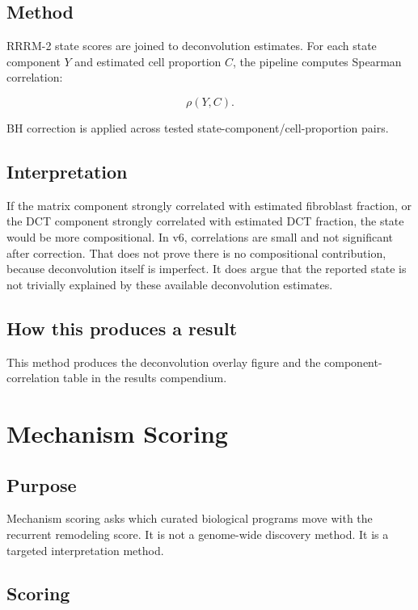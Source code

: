 \documentclass[11pt]{article}
\begin{document}
\subsection{Method}

RRRM-2 state scores are joined to deconvolution estimates. For each state component $Y$ and estimated cell proportion $C$, the pipeline computes Spearman correlation:

\begin{equation}
\rho(Y,C).
\end{equation}

BH correction is applied across tested state-component/cell-proportion pairs.

\subsection{Interpretation}

If the matrix component strongly correlated with estimated fibroblast fraction, or the DCT component strongly correlated with estimated DCT fraction, the state would be more compositional. In v6, correlations are small and not significant after correction. That does not prove there is no compositional contribution, because deconvolution itself is imperfect. It does argue that the reported state is not trivially explained by these available deconvolution estimates.

\subsection{How this produces a result}

This method produces the deconvolution overlay figure and the component-correlation table in the results compendium.

\section{Mechanism Scoring}

\subsection{Purpose}

Mechanism scoring asks which curated biological programs move with the recurrent remodeling score. It is not a genome-wide discovery method. It is a targeted interpretation method.

\subsection{Scoring}
\end{document}
